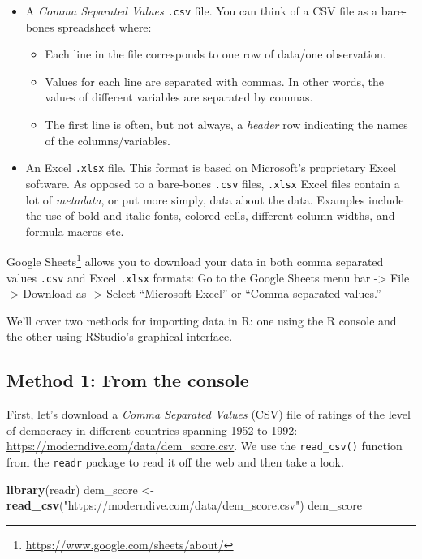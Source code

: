 \documentclass[12pt,]{krantz}
\makeatletter
\newenvironment{Shaded}{\begin{snugshade}}{\end{snugshade}}
\newcommand{\KeywordTok}[1]{\textcolor[rgb]{0.27,0.27,0.27}{\textbf{#1}}}
\newcommand{\StringTok}[1]{\textcolor[rgb]{0.5,0.5,0.5}{#1}}
\newcommand{\NormalTok}[1]{#1}
\providecommand{\tightlist}{%
  \setlength{\itemsep}{0pt}\setlength{\parskip}{0pt}}
\renewcommand{\href}[2]{#2\footnote{\url{#1}}}
\newenvironment{kframe}{%
\medskip{}
\setlength{\fboxsep}{.8em}
 \def\at@end@of@kframe{}%
 \ifinner\ifhmode%
  \def\at@end@of@kframe{\end{minipage}}%
  \begin{minipage}{\columnwidth}%
 \fi\fi%
 \def\FrameCommand##1{\hskip\@totalleftmargin \hskip-\fboxsep
 \colorbox{shadecolor}{##1}\hskip-\fboxsep
     \hskip-\linewidth \hskip-\@totalleftmargin \hskip\columnwidth}%
 \MakeFramed {\advance\hsize-\width
   \@totalleftmargin\z@ \linewidth\hsize
   \@setminipage}}%
 {\par\unskip\endMakeFramed%
 \at@end@of@kframe}
\renewenvironment{Shaded}{\begin{kframe}}{\end{kframe}}
\makeatother
\begin{document}
\begin{itemize}
\tightlist
\item
  A \emph{Comma Separated Values} \texttt{.csv} file. You can think of a
  CSV file as a bare-bones spreadsheet where:

  \begin{itemize}
  \tightlist
  \item
    Each line in the file corresponds to one row of data/one
    observation.
  \item
    Values for each line are separated with commas. In other words, the
    values of different variables are separated by commas.
  \item
    The first line is often, but not always, a \emph{header} row
    indicating the names of the columns/variables.
  \end{itemize}
\item
  An Excel \texttt{.xlsx} file. This format is based on Microsoft's
  proprietary Excel software. As opposed to a bare-bones \texttt{.csv}
  files, \texttt{.xlsx} Excel files contain a lot of \emph{metadata}, or
  put more simply, data about the data. Examples include the use of bold
  and italic fonts, colored cells, different column widths, and formula
  macros etc.
\end{itemize}

\href{https://www.google.com/sheets/about/}{Google Sheets} allows you to
download your data in both comma separated values \texttt{.csv} and
Excel \texttt{.xlsx} formats: Go to the Google Sheets menu bar
-\textgreater{} File -\textgreater{} Download as -\textgreater{} Select
``Microsoft Excel'' or ``Comma-separated values.''

We'll cover two methods for importing data in R: one using the R console
and the other using RStudio's graphical interface.

\subsection{Method 1: From the console}\label{method-1-from-the-console}

First, let's download a \emph{Comma Separated Values} (CSV) file of
ratings of the level of democracy in different countries spanning 1952
to 1992: \url{https://moderndive.com/data/dem_score.csv}. We use the
\texttt{read\_csv()} function from the \texttt{readr} package to read it
off the web and then take a look.

\begin{Shaded}
\begin{Highlighting}[]
\KeywordTok{library}\NormalTok{(readr)}
\NormalTok{dem_score <-}\StringTok{ }\KeywordTok{read_csv}\NormalTok{(}\StringTok{"https://moderndive.com/data/dem_score.csv"}\NormalTok{)}
\NormalTok{dem_score}
\end{Highlighting}
\end{Shaded}
\end{document}
